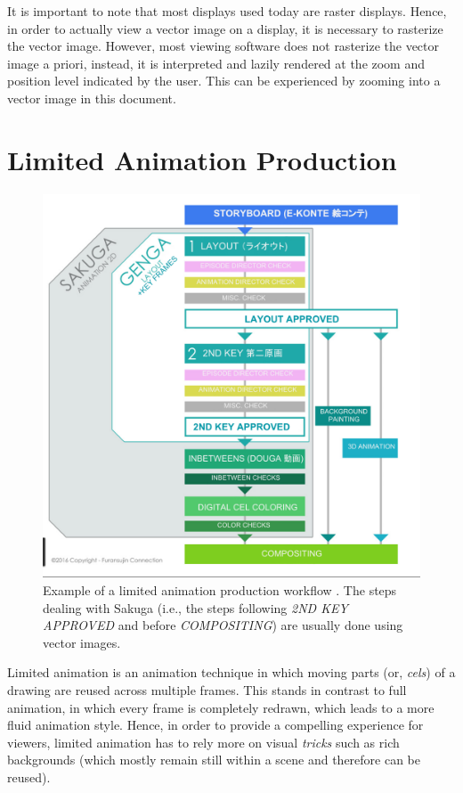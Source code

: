 It is important to note that most displays used today are raster displays. Hence, in order to actually view a vector image on a display, it is necessary to rasterize the vector image. However, most viewing software does not rasterize the vector image a priori, instead, it is interpreted and lazily rendered at the zoom and position level indicated by the user. This can be experienced by zooming into a vector image in this document.

\section{Limited Animation Production}
\label{sec:anime.prod}

\begin{figure}[h]
    \centering
    \includegraphics[width=\columnwidth]{graphics/workflow.png}
    \caption{Example of a limited animation production workflow \citep{etapes_fabrication}. The steps dealing with Sakuga (i.e., the steps following \emph{2ND KEY APPROVED} and before \emph{COMPOSITING}) are usually done using vector images.}
    \label{fig:workflow}
\end{figure}

Limited animation is an animation technique in which moving parts (or, \emph{cels}) of a drawing are reused across multiple frames. This stands in contrast to full animation, in which every frame is completely redrawn, which leads to a more fluid animation style. Hence, in order to provide a compelling experience for viewers, limited animation has to rely more on visual \emph{tricks} such as rich backgrounds (which mostly remain still within a scene and therefore can be reused).


